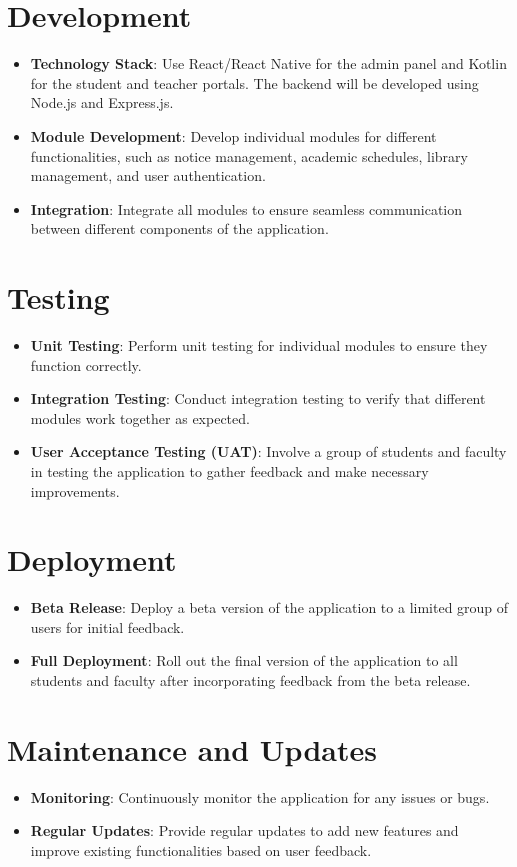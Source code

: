 \section{Development}
\begin{itemize}
    \item \textbf{Technology Stack}: Use React/React Native for the admin panel and Kotlin for the student and teacher portals. The backend will be developed using Node.js and Express.js.
    \item \textbf{Module Development}: Develop individual modules for different functionalities, such as notice management, academic schedules, library management, and user authentication.
    \item \textbf{Integration}: Integrate all modules to ensure seamless communication between different components of the application.
\end{itemize}

\section{Testing}
\begin{itemize}
    \item \textbf{Unit Testing}: Perform unit testing for individual modules to ensure they function correctly.
    \item \textbf{Integration Testing}: Conduct integration testing to verify that different modules work together as expected.
    \item \textbf{User Acceptance Testing (UAT)}: Involve a group of students and faculty in testing the application to gather feedback and make necessary improvements.
\end{itemize}

\section{Deployment}
\begin{itemize}
    \item \textbf{Beta Release}: Deploy a beta version of the application to a limited group of users for initial feedback.
    \item \textbf{Full Deployment}: Roll out the final version of the application to all students and faculty after incorporating feedback from the beta release.
\end{itemize}

\section{Maintenance and Updates}
\begin{itemize}
    \item \textbf{Monitoring}: Continuously monitor the application for any issues or bugs.
    \item \textbf{Regular Updates}: Provide regular updates to add new features and improve existing functionalities based on user feedback.
\end{itemize}

